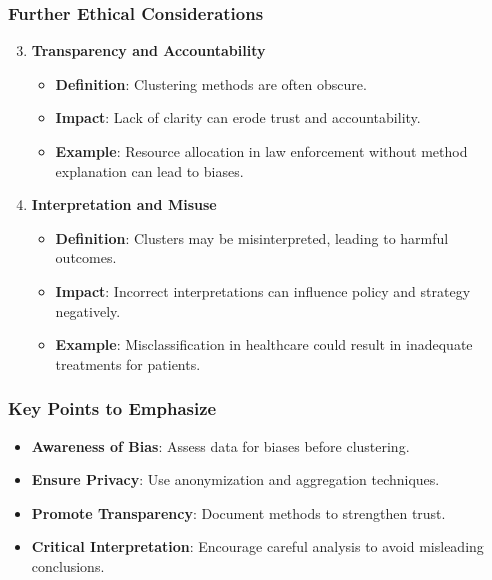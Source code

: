 \documentclass[aspectratio=169]{beamer}
\begin{document}
\begin{frame}[fragile]
    \frametitle{Further Ethical Considerations}
    \begin{enumerate}
        \setcounter{enumi}{2} %
        \item \textbf{Transparency and Accountability}
        \begin{itemize}
            \item \textbf{Definition}: Clustering methods are often obscure.
            \item \textbf{Impact}: Lack of clarity can erode trust and accountability.
            \item \textbf{Example}: Resource allocation in law enforcement without method explanation can lead to biases.
        \end{itemize}

        \item \textbf{Interpretation and Misuse}
        \begin{itemize}
            \item \textbf{Definition}: Clusters may be misinterpreted, leading to harmful outcomes.
            \item \textbf{Impact}: Incorrect interpretations can influence policy and strategy negatively.
            \item \textbf{Example}: Misclassification in healthcare could result in inadequate treatments for patients.
        \end{itemize}
    \end{enumerate}
\end{frame}

\begin{frame}[fragile]
    \frametitle{Key Points to Emphasize}
    \begin{itemize}
        \item \textbf{Awareness of Bias}: Assess data for biases before clustering.
        \item \textbf{Ensure Privacy}: Use anonymization and aggregation techniques.
        \item \textbf{Promote Transparency}: Document methods to strengthen trust.
        \item \textbf{Critical Interpretation}: Encourage careful analysis to avoid misleading conclusions.
    \end{itemize}
\end{frame}
\end{document}

